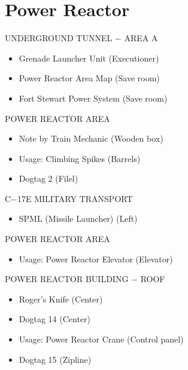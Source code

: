 \chapter{Power Reactor}

\begin{subregion}{UNDERGROUND TUNNEL $\boldsymbol{-}$ AREA A}
    \begin{itemize}
        \item Grenade Launcher Unit (Executioner)
        \item Power Reactor Area Map (Save room)
        \item Fort Stewart Power System (Save room)
    \end{itemize}
\end{subregion}

\begin{subregion}{POWER REACTOR AREA}
    \begin{itemize}
        \item Note by Train Mechanic (Wooden box)
        \item Usage: Climbing Spikes (Barrels)
        \item Dogtag 2 (Filel)
    \end{itemize}
\end{subregion}

\begin{subregion}{C$\boldsymbol{-}$17E MILITARY TRANSPORT}
    \begin{itemize}
        \item SPML (Missile Launcher) (Left)
    \end{itemize}
\end{subregion}

\begin{subregion}{POWER REACTOR AREA}
    \begin{itemize}
        \item Usage: Power Reactor Elevator (Elevator)
    \end{itemize}
\end{subregion}

\begin{subregion}{POWER REACTOR BUILDING $\boldsymbol{-}$ ROOF}
    \begin{itemize}
        \item Roger's Knife (Center)
        \item Dogtag 14 (Center)
        \item Usage: Power Reactor Crane (Control panel)
        \item Dogtag 15 (Zipline)
    \end{itemize}
\end{subregion}
